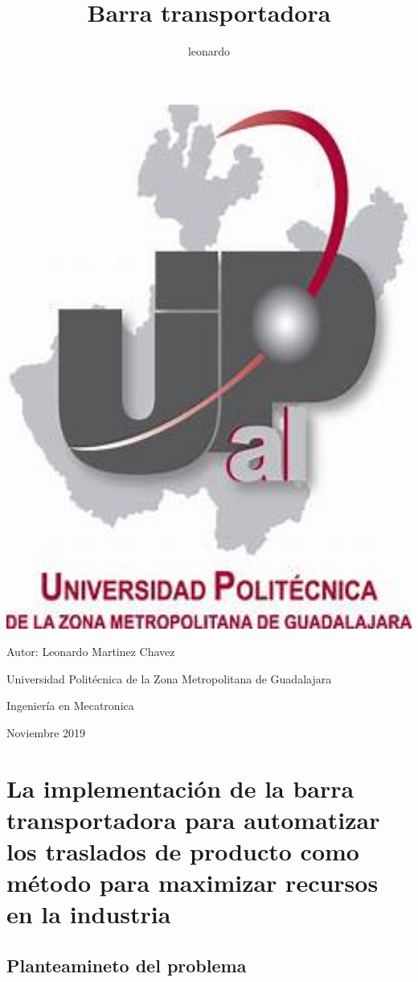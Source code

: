 \documentclass[12pt,a4paper]{article}
\author{leonardo}
\title{Barra transportadora}
\begin{document}
\includegraphics[width=15cm]{1.jpg} 
\begin{flushleft}
Autor: Leonardo Martinez Chavez 
\end{flushleft}
\begin{flushleft}
Universidad Politécnica de la Zona Metropolitana de Guadalajara
\end{flushleft}
\begin{flushleft}
Ingeniería en Mecatronica                                              

\end{flushleft}
\begin{flushleft}
Noviembre 2019 
\end{flushleft}
\section{
La implementación de la barra transportadora para automatizar  los traslados de producto como método para maximizar recursos en la industria
}
\subsection{Planteamineto del problema}
\end{document}
